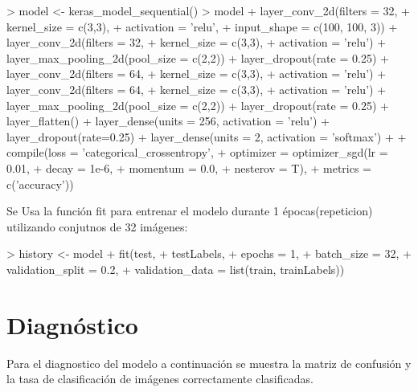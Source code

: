 \documentclass[11pt,twoside]{article}
\begin{document}
\begin{Schunk}
\begin{Sinput}
> model <- keras_model_sequential()
> model %>%
+          layer_conv_2d(filters = 32, 
+                        kernel_size = c(3,3),
+                        activation = 'relu',
+                        input_shape = c(100, 100, 3)) %>%
+          layer_conv_2d(filters = 32,
+                        kernel_size = c(3,3),
+                        activation = 'relu') %>%
+          layer_max_pooling_2d(pool_size = c(2,2)) %>%
+          layer_dropout(rate = 0.25) %>%
+          layer_conv_2d(filters = 64,
+                        kernel_size = c(3,3),
+                        activation = 'relu') %>%
+          layer_conv_2d(filters = 64,
+                        kernel_size = c(3,3),
+                        activation = 'relu') %>%
+          layer_max_pooling_2d(pool_size = c(2,2)) %>%
+          layer_dropout(rate = 0.25) %>%
+          layer_flatten() %>%
+          layer_dense(units = 256, activation = 'relu') %>%
+          layer_dropout(rate=0.25) %>%
+          layer_dense(units = 2, activation = 'softmax') %>%
+          
+          compile(loss = 'categorical_crossentropy',
+                  optimizer = optimizer_sgd(lr = 0.01,
+                                            decay = 1e-6,
+                                            momentum = 0.0,
+                                            nesterov = T),
+                  metrics = c('accuracy'))
\end{Sinput}
\end{Schunk}

Se Usa la función fit para entrenar el modelo durante 1 épocas(repeticion) utilizando conjutnos de 32 imágenes:

\begin{Schunk}
\begin{Sinput}
> history <- model %>%
+          fit(test,
+              testLabels,
+              epochs = 1,
+              batch_size = 32,
+              validation_split = 0.2,
+              validation_data = list(train, trainLabels))
\end{Sinput}
\end{Schunk}


\section*{Diagnóstico}
\noindent
Para el diagnostico del modelo a continuación se muestra la matriz de confusión y la tasa de clasificación de imágenes correctamente clasificadas.
\end{document}
